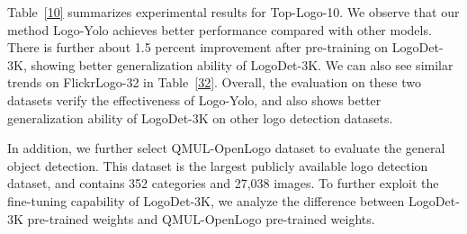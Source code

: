 \documentclass[journal]{IEEEtran}
\begin{document}
\begin{table}[!t]
	\caption{The performance of Logo-Yolo on FlickrLogos-32 (\%).}
	\label{32}
	\centering
\end{table}
Table~\ref{10} summarizes experimental results for Top-Logo-10. We observe that our method Logo-Yolo achieves better performance compared with other models. There is further about 1.5 percent improvement after pre-training on LogoDet-3K, showing better generalization ability of LogoDet-3K. We can also see similar trends on FlickrLogo-32 in Table~\ref{32}. Overall, the evaluation on these two datasets verify the effectiveness of Logo-Yolo, and also shows better generalization ability of LogoDet-3K on other logo detection datasets.

In addition, we further select QMUL-OpenLogo dataset to evaluate the general object detection. This dataset is the largest publicly available logo detection dataset, and contains 352 categories and 27,038 images. To further exploit the fine-tuning capability of LogoDet-3K, we analyze the difference between LogoDet-3K pre-trained weights and QMUL-OpenLogo pre-trained weights. 
\end{document}

